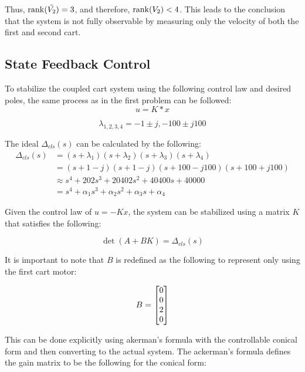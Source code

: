 \documentclass[]{article}
\begin{document}
			Thus, $\rank(\tilde{V_2}) = 3$, and therefore, $\rank(V_2) < 4$. This leads to the conclusion that the system is not fully observable by measuring only the velocity of both the first and second cart.
	
	\newpage
	\subsection{State Feedback Control}
		To stabilize the coupled cart system using the following control law and desired poles, the same process as in the first problem can be followed:
		\begin{equation}
			u = K * x
		\end{equation}
	
		\begin{equation}
			\lambda_{1,2,3,4} = {-1 \pm j, -100 \pm j100}
			\label{eq:Desiered_poles2}
		\end{equation}
		
		The ideal $\Delta_{cls} (s)$ can be calculated by the following:
		\begin{equation}
			\begin{aligned}
				\Delta_{cls} (s) &= (s + \lambda_1) (s + \lambda_2) (s + \lambda_3)(s+\lambda_4)\\
				&= (s + 1 - j) (s + 1 -j) (s+ 100 - j100)(s + 100 + j100)\\
				&\approx s^4 + 202 s^3 + 20402 s^2 + 40400 s + 40000\\
				&= s^4 + \alpha_1 s^3 + \alpha_2 s^2 + \alpha_3 s + \alpha_4
			\end{aligned} \label{eq:ideal_char_poly2}
		\end{equation}
		
		Given the control law of $u = - K x$, the system can be stabilized using a matrix $K$ that satisfies the following:
		
		\begin{equation}
			\det(A + B K) = \Delta_{cls} (s)
		\end{equation}
		
		It is important to note that $B$ is redefined as the following to represent only using the first cart motor:
		
		\begin{equation}
			B = \mqty[0\\0\\2\\0]
		\end{equation}
		
		This can be done explicitly using akerman's formula with the controllable conical form and then converting to the actual system. The ackerman's formula defines the gain matrix to be the following for the conical form:
		
\end{document}
